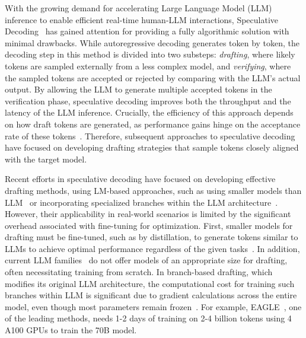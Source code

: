 With the growing demand for accelerating Large Language Model (LLM) inference to enable efficient real-time human-LLM interactions, Speculative Decoding~\cite{BlockWise, SpecDecoding, SpecSampling} has gained attention for providing a fully algorithmic solution with minimal drawbacks.
While autoregressive decoding generates token by token, the decoding step in this method is divided into two substeps: \textit{drafting}, where likely tokens are sampled externally from a less complex model, and \textit{verifying}, where the sampled tokens are accepted or rejected by comparing with the LLM’s actual output.
By allowing the LLM to generate multiple accepted tokens in the verification phase, speculative decoding improves both the throughput and the latency of the LLM inference. 
Crucially, the efficiency of this approach depends on how draft tokens are generated, as performance gains hinge on the acceptance rate of these tokens~\cite{SpecSampling}.
Therefore, subsequent approaches to speculative decoding have focused on developing drafting strategies that sample tokens closely aligned with the target model.



Recent efforts in speculative decoding have focused on developing effective drafting methods, using LM-based approaches, such as using smaller models than LLM~\cite{DistilSpec, SpecInfer} or incorporating specialized branches within the LLM architecture~\cite{MEDUSA, EAGLE2}.
However, their applicability in real-world scenarios is limited by the significant overhead associated with fine-tuning for optimization.
First, smaller models for drafting must be fine-tuned, such as by distillation, to generate tokens similar to LLMs to achieve optimal performance regardless of the given tasks~\cite{DistilSpec, multilingual}.
In addition, current LLM families~\cite{Llama2, vicuna} do not offer models of an appropriate size for drafting, often necessitating training from scratch.
In branch-based drafting, which modifies its original LLM architecture, the computational cost for training such branches within LLM is significant due to gradient calculations across the entire model, even though most parameters remain frozen~\cite{MEDUSA, EAGLE2, EAGLE}.
For example, EAGLE~\cite{EAGLE}, one of the leading methods, needs 1-2 days of training on 2-4 billion tokens using 4 A100 GPUs to train the 70B model.


